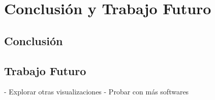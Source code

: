 \chapter{Conclusión y Trabajo Futuro}
\section{Conclusión}

\section{Trabajo Futuro}

- Explorar otras visualizaciones
- Probar con más softwares


